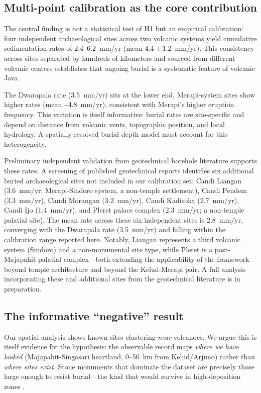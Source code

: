 \documentclass[12pt,letterpaper]{article}
\begin{document}
\subsection{Multi-point calibration as the core contribution}

The central finding is not a statistical test of H1 but an empirical calibration: four independent archaeological sites across two volcanic systems yield cumulative sedimentation rates of 2.4--6.2~mm/yr (mean $4.4 \pm 1.2$~mm/yr). This consistency across sites separated by hundreds of kilometers and sourced from different volcanic centers establishes that ongoing burial is a systematic feature of volcanic Java.

The Dwarapala rate (3.5~mm/yr) sits at the lower end. Merapi-system sites show higher rates (mean \textasciitilde4.8~mm/yr), consistent with Merapi's higher eruption frequency. This variation is itself informative: burial rates are site-specific and depend on distance from volcanic vents, topographic position, and local hydrology. A spatially-resolved burial depth model must account for this heterogeneity.

Preliminary independent validation from geotechnical borehole literature supports these rates. A screening of published geotechnical reports identifies six additional buried archaeological sites not included in our calibration set: Candi Liangan (3.6~mm/yr; Merapi-Sindoro system, a non-temple settlement), Candi Pendem (3.3~mm/yr), Candi Morangan (3.2~mm/yr), Candi Kadisoka (2.7~mm/yr), Candi Ijo (1.4~mm/yr), and Pleret palace complex (2.3~mm/yr; a non-temple palatial site). The mean rate across these six independent sites is 2.8~mm/yr, converging with the Dwarapala rate (3.5~mm/yr) and falling within the calibration range reported here. Notably, Liangan represents a third volcanic system (Sindoro) and a non-monumental site type, while Pleret is a post-Majapahit palatial complex---both extending the applicability of the framework beyond temple architecture and beyond the Kelud-Merapi pair. A full analysis incorporating these and additional sites from the geotechnical literature is in preparation.

\subsection{The informative ``negative'' result}

Our spatial analysis shows known sites clustering \textit{near} volcanoes. We argue this is itself evidence for the hypothesis: the observable record maps \textit{where we have looked} (Majapahit-Singosari heartland, 0--50~km from Kelud/Arjuno) rather than \textit{where sites exist}. Stone monuments that dominate the dataset are precisely those large enough to resist burial---the kind that would survive in high-deposition zones \citep{verhagen2012}.
\end{document}
